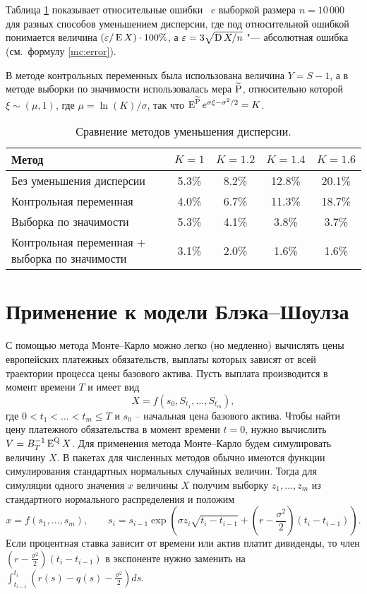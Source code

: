 Таблица \ref{mc:t:example} показывает относительные ошибки \mc\ c выборкой размера $n=10\,000$ для разных способов уменьшением дисперсии, где под относительной ошибкой понимается величина $(\epsilon/\E X) \cdot 100\%$, а $\epsilon = 3\sqrt{\D X / n}$ "--- абсолютная ошибка (см.~формулу \eqref{mc:error}).

В методе контрольных переменных была использована величина $Y=S-1$, а в методе выборки по значимости использовалась мера $\tilde \P$, относительно которой $\xi\sim(\mu,1)$, где $\mu=\ln(K)/\sigma$, так что $\E^{\tilde\P} e^{\sigma\xi - \sigma^2/2} = K$.




\begin{table}[h]
\centering
\begin{tabular}{|p{6.5cm}|c|c|c|c|}
\hline
Метод & $K=1$ & $K=1.2$ & $K=1.4$ & $K=1.6$ \\\hline
Без уменьшения дисперсии &
5.3\% & 8.2\% & 12.8\% & 20.1\% \\\hline
Контрольная переменная &
4.0\% & 6.7\% & 11.3\% & 18.7\% \\\hline
Выборка по значимости &
5.3\% & 4.1\% & 3.8\% & 3.7\% \\\hline
Контрольная переменная + выборка по значимости &
3.1\% & 2.0\% & 1.6\% & 1.6\% \\\hline
\end{tabular}
\caption{Сравнение методов уменьшения дисперсии.}
\label{mc:t:example}  
\end{table}


\section{Применение к модели Блэка--Шоулза}

С помощью метода Монте--Карло можно легко (но медленно) вычислять цены европейских платежных обязательств, выплаты которых зависят от всей траектории процесса цены базового актива.
Пусть выплата производится в момент времени $T$ и имеет вид
\[
X = f(s_0, S_{t_1}, \dots, S_{t_m}),
\]
где $0 < t_1 < \dots < t_m \le T$ и $s_0$ -- начальная цена базового актива.
Чтобы найти цену платежного обязательства в момент времени $t=0$, нужно вычислить $V = B_T^{-1}\E^{\Q} X$.
Для применения метода Монте--Карло будем симулировать  величину $X$. 
В пакетах для численных методов обычно имеются функции симулирования стандартных нормальных случайных величин.
Тогда для симуляции одного значения $x$ величины $X$ получим выборку $z_1,\dots,z_m$ из стандартного нормального распределения и положим
\[
x = f(s_1,\dots,s_m), \qquad
s_i = s_{i-1} \exp\left(\sigma z_i \sqrt{t_i - t_{i-1}}  + \left(r-\frac{\sigma^2}{2}\right)(t_i - t_{i-1})\right).
\]
Если процентная ставка зависит от времени или актив платит дивиденды, то член $(r-\frac{\sigma^2}{2})(t_i - t_{i-1})$ в экспоненте нужно заменить на $\int_{t_{i-1}}^{t_i} (r(s) - q(s) - \frac{\sigma^2}{2}) ds$.

